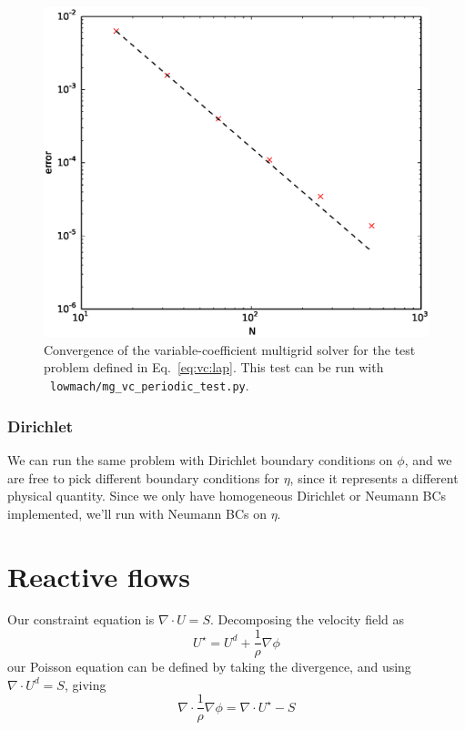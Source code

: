 \begin{figure}[t]
\centering
\includegraphics[width=0.8\linewidth]{mg_vc_converge}
\caption{\label{fig:mg_vc_converge} Convergence of the variable-coefficient
multigrid solver for the test problem defined in Eq.~\ref{eq:vc:lap}.  This test can be
run with \pyro\ {\tt lowmach/mg\_vc\_periodic\_test.py}.}
\end{figure}

\subsubsection{Dirichlet}

We can run the same problem with Dirichlet boundary conditions on $\phi$,
and we are free to pick different boundary conditions for $\eta$, since
it represents a different physical quantity.  Since we only have homogeneous
Dirichlet or Neumann BCs implemented, we'll run with Neumann BCs on $\eta$.

\section{Reactive flows}

Our constraint equation is $\nabla \cdot U = S$.  Decomposing the
velocity field as
\begin{equation}
U^\star = U^d + \frac{1}{\rho} \nabla \phi
\end{equation}
our Poisson equation can be defined by taking the divergence, and
using $\nabla \cdot U^d = S$, giving
\begin{equation}
\nabla \cdot \frac{1}{\rho} \nabla \phi = \nabla \cdot U^\star - S
\end{equation}


